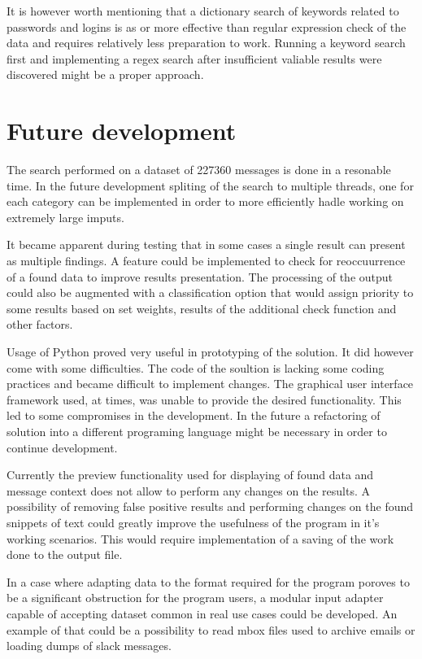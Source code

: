 \documentclass[a4paper,twoside,12pt]{book}
\begin{document}
It is however worth mentioning that a dictionary search of keywords related to passwords and
logins is as or more effective than regular expression check of the data and requires relatively
less preparation to work. Running a keyword search first and implementing a regex search after 
insufficient valiable results were discovered might be a proper approach.

\section{Future development}

The search performed on a dataset of 227360 messages is done in a resonable time. In the future development
spliting of the search to multiple threads, one for each category can be implemented in order to more efficiently
hadle working on extremely large imputs. 

It became apparent during testing that in some cases a single result can present as multiple findings. 
A feature could be implemented to check for reoccuurrence of a found data to improve
results presentation. The processing of the output could also be augmented with a classification
option that would assign priority to some results based on set weights, results of the additional
check function and other factors.
 
Usage of Python proved very useful in prototyping of the solution. It did however come with some difficulties.
The code of the soultion is lacking some coding practices and became difficult to implement changes.
The graphical user interface framework used, at times, was unable to provide the desired functionality. This led to some
compromises in the development. In the future a refactoring of solution into a different programing language might 
be necessary in order to continue development. 

Currently the preview functionality used for displaying of found data and message context 
does not allow to perform any changes on the results. A possibility of removing false positive 
results and performing changes on the found snippets of text could greatly improve the 
usefulness of the program in it's working scenarios. This would require implementation of a saving of the work
done to the output file.

In a case where adapting data to the format required for the program poroves to be a significant 
obstruction for the program users, a modular input adapter capable of accepting dataset common in 
real use cases could be developed. An example of that could be a possibility to read mbox files 
used to archive emails or loading dumps of slack messages.
\end{document}
